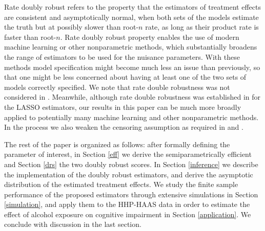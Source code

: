 \documentclass[11pt]{article}
\begin{document}
 Rate doubly robust refers to the property that the estimators of treatment effects are consistent and asymptotically normal, when both sets of the models estimate the truth but at possibly slower than root-$n$ rate, as long as their product rate is faster than root-$n$. Rate doubly robust property enables the use of modern machine learning or other nonparametric methods, which substantially broadens the range of estimators to be used for the  nuisance parameters. With these methods model specification might become much less an issue than previously, so that one might be less concerned about having at least one of the two sets of models correctly specified. 
We note that  rate double robustness  was  not considered in  \cite{Dukes:19}.
 Meanwhile, although rate double robustness was established in \cite{hou2019estimating} for the LASSO estimators, our results in this paper can be much more broadly applied to potentially many machine learning and other nonparametric methods.
In the process we also weaken the censoring assumption as required in \cite{Dukes:19} and \cite{hou2019estimating}. 


The rest of the paper is organized as follows: after formally defining the parameter of interest, in Section \ref{eff} we derive the semiparametrically efficient and Section \ref{drs} the two doubly robust scores. In Section \ref{inference} we describe the implementation of the doubly robust estimators, and
  derive the asymptotic distribution of the estimated treatment effects.
   We study the finite sample performance of the proposed estimators through extensive simulations in Section \ref{simulation}, and  apply them to the HHP-HAAS data in order to estimate the effect of alcohol exposure on  cognitive impairment in Section \ref{application}. We conclude with discussion in the last section.



\end{document}
